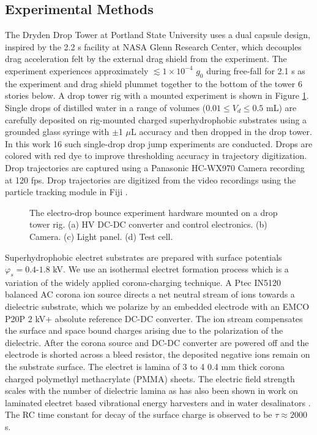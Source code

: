\documentclass[aip,reprint, floatfix]{revtex4-1}
\begin{document}
\subsection{Experimental Methods}
The Dryden Drop Tower at Portland State University uses a dual capsule design, inspired by the 2.2 s facility at NASA Glenn Research Center, which decouples drag acceleration felt by the external drag shield from the experiment. The experiment experiences approximately $\lesssim 1 \times 10^{-4}$ $g_0$ during free-fall for 2.1 s as the experiment and drag shield plummet together to the bottom of the tower 6 stories below. A drop tower rig with a mounted experiment is shown in Figure \ref{fig:rig}. Single drops of distilled water in a range of volumes ($0.01 \leq V_d \leq 0.5$ mL) are carefully deposited on rig-mounted charged superhydrophobic substrates using a grounded glass syringe with $\pm $1 $\mu$L accuracy and then dropped in the drop tower. In this work 16 such single-drop drop jump experiments are conducted. Drops are colored with red dye to improve thresholding accuracy in trajectory digitization. Drop trajectories are captured using a Panasonic HC-WX970 Camera recording at 120 fps. Drop trajectories are digitized from the video recordings using the particle tracking module in Fiji \cite{schindelin_fiji:_2012}.

\begin{figure}
    \centering
    \fontsize{12pt}{13pt}\selectfont
    \def\svgwidth{\columnwidth}
    \caption{The electro-drop bounce experiment hardware mounted on a drop tower rig. (a) HV DC-DC converter and control electronics. (b) Camera. (c) Light panel. (d) Test cell. \label{fig:rig}}
\end{figure}

Superhydrophobic electret substrates are prepared with surface potentials $\varphi_s = 0.4$-$1.8$ kV. We use an isothermal electret formation process which is a variation of the widely applied corona-charging technique. A Ptec IN5120 balanced AC corona ion source directs a net neutral stream of ions towards a dielectric substrate, which we polarize by an embedded electrode with an EMCO P20P $2$ kV$+$ absolute reference DC-DC converter. The ion stream compensates the surface and space bound charges arising due to the polarization of the dielectric. After the corona source and DC-DC converter are powered off and the electrode is shorted across a bleed resistor, the deposited negative ions remain on the substrate surface. The electret is lamina of 3 to 4 0.4 mm thick corona charged polymethyl methacrylate (PMMA) sheets. The electric field strength scales with the number of dielectric lamina as has also been shown in work on laminated electret based vibrational energy harvesters \cite{wada_stacking_2012} and in water desalinators \cite{ni_desalination_2005}. The RC time constant for decay of the surface charge is observed to be $\tau \approx 2000$ s.
\end{document}
